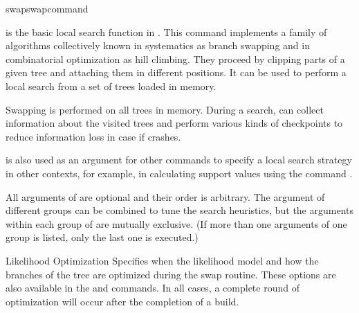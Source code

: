 \begin{command}{swap}{swapcommand}


	\begin{poydescription} 
         is the basic local search function in \poy. This
        command implements a family of algorithms collectively known in systematics as
        branch swapping and in combinatorial optimization as hill climbing. 
        They proceed by clipping parts of a given tree and
        attaching them in different positions.  It can be
        used to perform a local search from a set of trees loaded in memory.

        Swapping is performed on all trees in memory. During a search,
         can collect information about the
        visited trees and perform various kinds of checkpoints to reduce
        information loss in case if \poy crashes.

         is also used as an argument for other
        commands to specify a local search strategy in other contexts, for example,
        in calculating support values using the command
        .
        
        All arguments of  are optional and their order
        is arbitrary. The argument of different groups can be combined to tune the search 
        heuristics, but the arguments within each group of are mutually exclusive. (If more 
        than one arguments of one group is listed, only the last one is executed.)
    \end{poydescription}

	\begin{arguments}

        \begin{argumentgroup}{Likelihood Optimization}
            {Specifies when the likelihood model and how the branches of the
            tree are optimized during the swap routine. These options are also
            available in the  and 
            commands. In all cases, a complete round of optimization will occur
            after the completion of a build.}

                {
                \begin{description}


\end{description}}
\end{argumentgroup}
\end{arguments}
\end{command}
